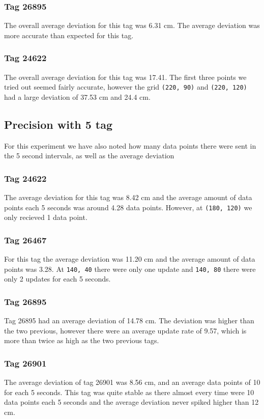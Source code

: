 \subsubsection{Tag 26895}
The overall average deviation for this tag was 6.31 cm.
The average deviation was more accurate than expected for this tag.

\subsubsection{Tag 24622}
The overall average deviation for this tag was 17.41.
The first three points we tried out seemed fairly accurate, however the grid \texttt{(220, 90)} and \texttt{(220, 120)} had a large deviation of 37.53 cm and 24.4 cm.

\subsection{Precision with 5 tag}
For this experiment we have also noted how many data points there were sent in the 5 second intervals, as well as the average deviation

\subsubsection{Tag 24622}
The average deviation for this tag was 8.42 cm and the average amount of data points each 5 seconds was around 4.28 data points.
However, at \texttt{(180, 120)} we only recieved 1 data point.

\subsubsection{Tag 26467}
For this tag the average deviation was 11.20 cm and the average amount of data points was 3.28.
At \texttt{140, 40} there were only one update and \texttt{140, 80} there were only 2 updates for each 5 seconds.

\subsubsection{Tag 26895}
Tag 26895 had an average deviation of 14.78 cm. 
The deviation was higher than the two previous, however there were an average update rate of 9.57, which is more than twice as high as the two previous tags.

\subsubsection{Tag 26901}
The average deviation of tag 26901 was 8.56 cm, and an average data points of 10 for each 5 seconds.
This tag was quite stable as there almost every time were 10 data points each 5 seconds and the average deviation never spiked higher than 12 cm.

